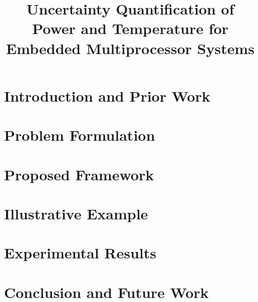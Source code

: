 \documentclass{sig-alternate}
\begin{document}
  \title{Uncertainty Quantification of Power and Temperature for Embedded Multiprocessor Systems}

  \maketitle

  \begin{abstract}
    
  \end{abstract}

  \section{Introduction and Prior Work} 
  

  \vspace{-0.5em}
  \section{Problem Formulation}    
  

  \vspace{-0.5em}
  \section{Proposed Framework} 
  

  \vspace{-0.5em}
  \section{Illustrative Example} 
  

  \vspace{-0.5em}
  \section{Experimental Results} 
  

  \vspace{-0.5em}
  \section{Conclusion and Future Work} 
  

  \vspace{-0.5em}
  \printbibliography

  \appendix
  
\end{document}
